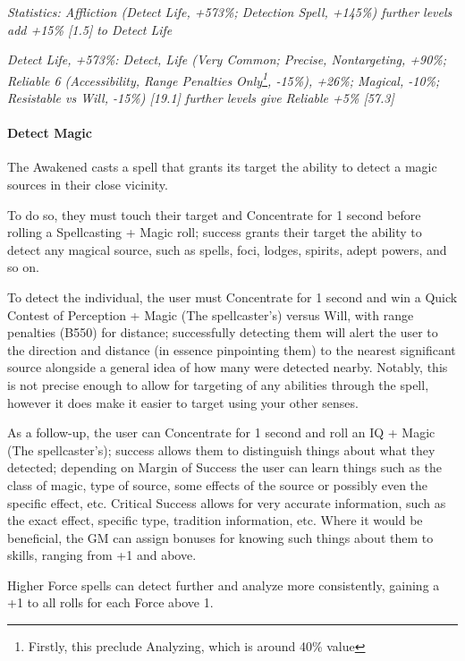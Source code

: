 \begin{multicols}{3}
	\textcolor{OliveGreen}{\textit{ Statistics: Affliction (Detect Life, +573\%; Detection Spell, +145\%) further levels add +15\% [1.5] to Detect Life}}
	
	\textcolor{OliveGreen}{\textit{Detect Life, +573\%: Detect, Life (Very Common; Precise, Nontargeting, +90\%; Reliable 6 (Accessibility, Range Penalties Only\footnote{Firstly, this preclude Analyzing, which is around 40\% value}, -15\%), +26\%; Magical, -10\%; Resistable vs Will, -15\%) [19.1] further levels give Reliable +5\% [57.3]}}
		
	\paragraph{Detect Magic}
	
	The Awakened casts a spell that grants its target the ability to detect a magic sources in their close vicinity.
	
	To do so, they must touch their target and Concentrate for 1 second before rolling a Spellcasting + Magic roll; success grants their target the ability to detect any magical source, such as spells, foci, lodges, spirits, adept powers, and so on.
	
	To detect the individual, the user must Concentrate for 1 second and win a Quick Contest of Perception + Magic (The spellcaster's) versus Will, with range penalties (B550) for distance; successfully detecting them will alert the user to the direction and distance (in essence pinpointing them) to the nearest significant source alongside a general idea of how many were detected nearby. Notably, this is not precise enough to allow for targeting of any abilities through the spell, however it does make it easier to target using your other senses.
	
	As a follow-up, the user can Concentrate for 1 second and roll an IQ + Magic (The spellcaster's); success allows them to distinguish things about what they detected; depending on Margin of Success the user can learn things such as the class of magic, type of source, some effects of the source or possibly even the specific effect, etc. Critical Success allows for very accurate information, such as the exact effect, specific type, tradition information, etc. Where it would be beneficial, the GM can assign bonuses for knowing such things about them to skills, ranging from +1 and above.
	
	Higher Force spells can detect further and analyze more consistently, gaining a +1 to all rolls for each Force above 1.	
	

\end{multicols}
